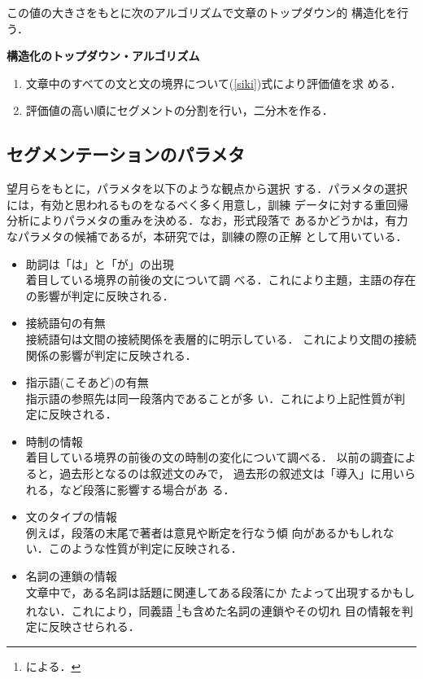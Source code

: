 この値の大きさをもとに次のアルゴリズムで文章のトップダウン的
構造化を行う．
\begin{description}
\item{\bf 構造化のトップダウン・アルゴリズム}
\begin{enumerate}
\item 文章中のすべての文と文の境界について(\ref{siki})式により評価値を求
      める．
\item 評価値の高い順にセグメントの分割を行い，二分木を作る．
\end{enumerate}
\end{description}

\subsection{セグメンテーションのパラメタ}

望月ら\cite{Mochiduki:96}をもとに，パラメタを以下のような観点から選択
する．パラメタの選択には，有効と思われるものをなるべく多く用意し，訓練
データに対する重回帰分析によりパラメタの重みを決める．なお，形式段落で
あるかどうかは，有力なパラメタの候補であるが，本研究では，訓練の際の正解
として用いている．

\begin{itemize}
 \item 助詞は「は」と「が」の出現 \\着目している境界の前後の文について調
       べる．これにより主題，主語の存在の影響が判定に反映される．
 \item 接続語句の有無 \\接続語句は文間の接続関係を表層的に明示している．
       これにより文間の接続関係の影響が判定に反映される．
 \item 指示語(こそあど)の有無 \\指示語の参照先は同一段落内であることが多
       い．これにより上記性質が判定に反映される．
 \item 時制の情報 \\着目している境界の前後の文の時制の変化について調べる．
       以前の調査\cite{Isoyama:94}によると，過去形となるのは叙述文のみで，
       過去形の叙述文は「導入」に用いられる，など段落に影響する場合があ
       る．
 \item 文のタイプの情報 \\例えば，段落の末尾で著者は意見や断定を行なう傾
       向があるかもしれない．このような性質が判定に反映される．
 \item 名詞の連鎖の情報 \\文章中で，ある名詞は話題に関連してある段落にか
       たよって出現するかもしれない．これにより，同義語
       \footnote{\cite{Hayashi:66}による．}も含めた名詞の連鎖やその切れ
       目の情報を判定に反映させられる．
\end{itemize}

